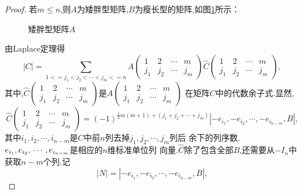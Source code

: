 \begin{proof}
若$m \le n$,则$A$为矮胖型矩阵,$B$为瘦长型的矩阵,如图\ref{fig:2}所示：

  \begin{figure}[!ht]
   \begin{center}
  \end{center}
  \caption{矮胖型矩阵$A$\label{fig:2}}
\end{figure}
由Laplace定理得
\begin{equation}\label{eq:1}
  |C|= \sum\limits_{1<=j_1<j_2<\cdots<j_m<=n}
  A\left(\begin{smallmatrix}
      1 & 2 & \cdots & m \\
      j_1 & j_2 & \cdots & j_m \end{smallmatrix}\right)
  \hat C\left(\begin{smallmatrix}
      1 & 2 & \cdots & m \\
      j_1 & j_2 & \cdots & j_m
    \end{smallmatrix}\right),
\end{equation}
其中,$\hat C\left(\begin{smallmatrix}
      1 & 2 & \cdots & m \\
      j_1 & j_2 & \cdots & j_m
      \end{smallmatrix}\right)$是$A\left(\begin{smallmatrix}
      1 & 2 & \cdots & m \\
      j_1 & j_2 & \cdots & j_m \end{smallmatrix}\right)$
  在矩阵$C$中的代数余子式.显然,
  \begin{equation}\label{eq:2}
    \hat C\left(\begin{smallmatrix}
      1 & 2 & \cdots & m \\
      j_1 & j_2 & \cdots & j_m
    \end{smallmatrix}\right)=(-1)^{\frac{1}{2}m(m+1)+(j_1+j_2+\cdots+j_m)}%
  |-e_{i_1},-e_{i_2},\cdots,-e_{i_{n-m}},B|,
  \end{equation}
  其中$i_1,i_2,\cdots,i_{n-m}$是$C$中前$n$列去掉$j_1,j_2,\cdots,j_m$列后
  余下的列序数.$e_{i_1},e_{i_2},\\\cdots,e_{i_{n-m}}$是相应的$n$维标准单位列
  向量.$\hat C$除了包含全部$B$,还需要从$-I_n$中获取$n-m$个列.记
  \[
    |N|=|-e_{i_1},-e_{i_2},\cdots,-e_{i_{n-m}},B|,
  \]


\end{proof}
